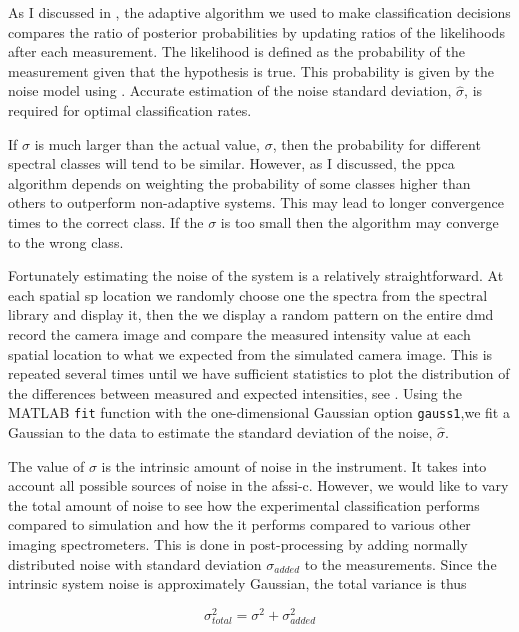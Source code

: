 As I discussed in , the adaptive algorithm we used to make classification decisions compares the ratio of posterior probabilities by updating ratios of the likelihoods after each measurement. The likelihood is defined as the probability of the measurement given that the hypothesis is true. This probability is given by the noise model using . Accurate estimation of the noise standard deviation, $\hat{\sigma}$, is required for optimal classification rates. 

If $\hat{\sigma}$ is much larger than the actual value,  $\sigma$, then the probability for different spectral classes will tend to be similar. However, as I discussed, the \gls{ppca} algorithm depends on weighting the probability of some classes higher than others to outperform non-adaptive systems. This may lead to longer convergence times to the correct class. If the $\sigma$ is too small then the algorithm may converge to the wrong class. 

Fortunately estimating the noise of the system is a relatively straightforward. At each spatial \gls{sp} location we randomly choose one the spectra from the spectral library and display it, then the we display a random pattern on the entire \gls{dmd} record the camera image and compare the measured intensity value at each spatial location to what we expected from the simulated camera image. This is repeated several times until we have sufficient statistics to plot the distribution of the differences between measured and expected intensities, see . Using the MATLAB \texttt{fit} function with the one-dimensional Gaussian option \texttt{gauss1},we fit a Gaussian to the data to estimate the standard deviation of the noise, $\hat{\sigma}$.

The value of $\sigma$ is the intrinsic amount of noise in the instrument. It takes into account all possible sources of noise in the \gls{afssi-c}. However, we would like to vary the total amount of noise to see how the experimental classification performs compared to simulation and how the it performs compared to various other imaging spectrometers. This is done in post-processing by adding normally distributed noise with standard deviation $\sigma_{added}$ to the measurements. Since the intrinsic system noise is approximately Gaussian, the total variance is thus

\begin{equation}
	\sigma_{total}^2 = \sigma^2 + \sigma_{added}^2
\end{equation}

